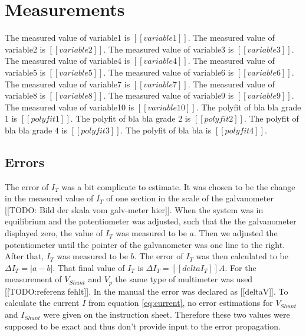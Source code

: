 \documentclass[a4paper]{article}
\begin{document}
\section{Measurements}
The measured value of variable1 is $[[variable1]]$.
\newline
The measured value of variable2 is $[[variable2]]$.
\newline
The measured value of variable3 is $[[variable3]]$.
\newline
The measured value of variable4 is $[[variable4]]$.
\newline
The measured value of variable5 is $[[variable5]]$.
\newline
The measured value of variable6 is $[[variable6]]$.
\newline
The measured value of variable7 is $[[variable7]]$.
\newline
The measured value of variable8 is $[[variable8]]$.
\newline
The measured value of variable9 is $[[variable9]]$.
\newline
The measured value of variable10 is $[[variable10]]$.
\newline
The polyfit of bla bla grade 1 is $[[polyfit1]]$.
\newline
The polyfit of bla bla grade 2 is $[[polyfit2]]$.
\newline
The polyfit of bla bla grade 4 is $[[polyfit3]]$.
\newline
The polyfit of bla bla is $[[polyfit4]]$.
\newline

\subsection{Errors}

The error of $I_T$ was a bit complicate to estimate. It was chosen to be the change in the measured value of $I_T$ of one section in the scale of the galvanometer [[TODO: Bild der skala vom galv-meter hier]]. When the system was in equilibrium and the potentiometer was adjusted, such that the the galvanometer displayed zero, the value of $I_T$ was measured to be $a$. Then we adjusted the potentiometer until the pointer of the galvanometer was one line to the right. After that, $I_T$ was measured to be $b$. The error of $I_T$ was then calculated to be $\Delta I_T = |a-b|$. That final value of $I_T$ is $\Delta I_T = [[deltaI_T]] A$.
\newline
For the measurement of $V_{Shunt}$ and $V_p$ the same type of multimeter was used [[TODO:referenz fehlt]]. In the manual the error was declared as [[deltaV]].
\newline
To calculate the current $I$ from equation \eqref{eq:current}, no error estimations for $V_{Shunt}$ and $I_{Shunt}$ were given on the instruction sheet. Therefore these two values were supposed to be exact and thus don't provide input to the error propagation.
\end{document}
